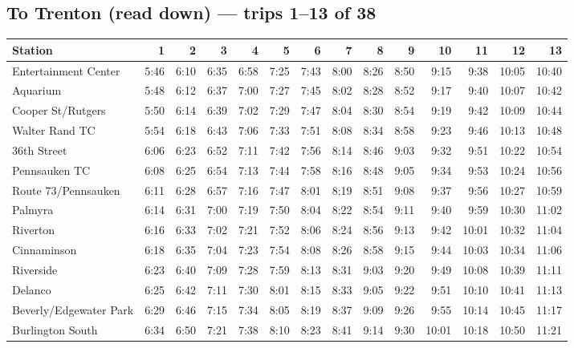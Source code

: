 \subsection*{To Trenton (read down) --- trips 1--13 of 38}
\begin{center}\footnotesize\setlength{\tabcolsep}{3pt}\begin{tabular}{@{}lrrrrrrrrrrrrr@{}}\toprule
Station & 1 & 2 & 3 & 4 & 5 & 6 & 7 & 8 & 9 & 10 & 11 & 12 & 13 \\\midrule
Entertainment Center & 5:46 & 6:10 & 6:35 & 6:58 & 7:25 & 7:43 & 8:00 & 8:26 & 8:50 & 9:15 & 9:38 & 10:05 & 10:40 \\
Aquarium & 5:48 & 6:12 & 6:37 & 7:00 & 7:27 & 7:45 & 8:02 & 8:28 & 8:52 & 9:17 & 9:40 & 10:07 & 10:42 \\
Cooper St/Rutgers & 5:50 & 6:14 & 6:39 & 7:02 & 7:29 & 7:47 & 8:04 & 8:30 & 8:54 & 9:19 & 9:42 & 10:09 & 10:44 \\
Walter Rand TC & 5:54 & 6:18 & 6:43 & 7:06 & 7:33 & 7:51 & 8:08 & 8:34 & 8:58 & 9:23 & 9:46 & 10:13 & 10:48 \\
36th Street & 6:06 & 6:23 & 6:52 & 7:11 & 7:42 & 7:56 & 8:14 & 8:46 & 9:03 & 9:32 & 9:51 & 10:22 & 10:54 \\
Pennsauken TC & 6:08 & 6:25 & 6:54 & 7:13 & 7:44 & 7:58 & 8:16 & 8:48 & 9:05 & 9:34 & 9:53 & 10:24 & 10:56 \\
Route 73/Pennsauken & 6:11 & 6:28 & 6:57 & 7:16 & 7:47 & 8:01 & 8:19 & 8:51 & 9:08 & 9:37 & 9:56 & 10:27 & 10:59 \\
Palmyra & 6:14 & 6:31 & 7:00 & 7:19 & 7:50 & 8:04 & 8:22 & 8:54 & 9:11 & 9:40 & 9:59 & 10:30 & 11:02 \\
Riverton & 6:16 & 6:33 & 7:02 & 7:21 & 7:52 & 8:06 & 8:24 & 8:56 & 9:13 & 9:42 & 10:01 & 10:32 & 11:04 \\
Cinnaminson & 6:18 & 6:35 & 7:04 & 7:23 & 7:54 & 8:08 & 8:26 & 8:58 & 9:15 & 9:44 & 10:03 & 10:34 & 11:06 \\
Riverside & 6:23 & 6:40 & 7:09 & 7:28 & 7:59 & 8:13 & 8:31 & 9:03 & 9:20 & 9:49 & 10:08 & 10:39 & 11:11 \\
Delanco & 6:25 & 6:42 & 7:11 & 7:30 & 8:01 & 8:15 & 8:33 & 9:05 & 9:22 & 9:51 & 10:10 & 10:41 & 11:13 \\
Beverly/Edgewater Park & 6:29 & 6:46 & 7:15 & 7:34 & 8:05 & 8:19 & 8:37 & 9:09 & 9:26 & 9:55 & 10:14 & 10:45 & 11:17 \\
Burlington South & 6:34 & 6:50 & 7:21 & 7:38 & 8:10 & 8:23 & 8:41 & 9:14 & 9:30 & 10:01 & 10:18 & 10:50 & 11:21 \\

\end{tabular}
\end{center}
